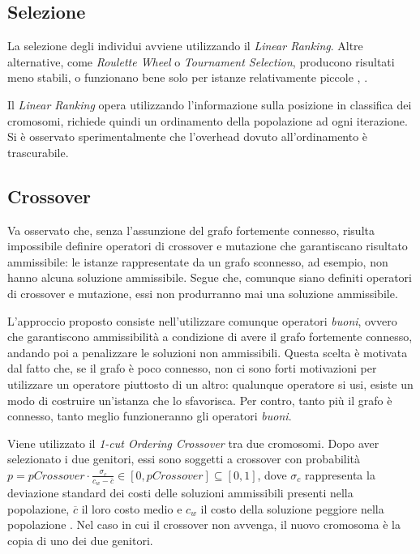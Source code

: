 \documentclass[a4paper, 10pt]{report}
\begin{document}
\subsection{Selezione}
La selezione degli individui avviene utilizzando il \emph{Linear Ranking}.
Altre alternative, come \emph{Roulette Wheel} o \emph{Tournament Selection},
producono risultati meno stabili, o funzionano bene solo per istanze relativamente
piccole \cite[Oladele et al.]{oladele2013}, \cite[Noraini et al.]{noraini2011}.

Il \emph{Linear Ranking} opera utilizzando l'informazione sulla posizione in
classifica dei cromosomi, richiede quindi un ordinamento della popolazione ad
ogni iterazione. Si è osservato sperimentalmente che l'overhead dovuto
all'ordinamento è trascurabile.


\subsection{Crossover}
Va osservato che, senza l'assunzione del grafo fortemente connesso,
risulta impossibile definire operatori di crossover e mutazione che
garantiscano risultato ammissibile: le istanze rappresentate da un
grafo sconnesso, ad esempio, non hanno alcuna soluzione ammissibile.
Segue che, comunque siano definiti operatori di crossover e mutazione,
essi non produrranno mai una soluzione ammissibile.

L'approccio proposto consiste nell'utilizzare comunque operatori \emph{buoni},
ovvero che garantiscono ammissibilità a condizione di avere il grafo fortemente
connesso, andando poi a penalizzare le soluzioni non ammissibili. Questa
scelta è motivata dal fatto che, se il grafo è poco connesso, non ci
sono forti motivazioni per utilizzare un operatore piuttosto di un altro:
qualunque operatore si usi, esiste un modo di costruire un'istanza che
lo sfavorisca. Per contro, tanto più il grafo è connesso, tanto
meglio funzioneranno gli operatori \emph{buoni}.

Viene utilizzato il \emph{1-cut Ordering Crossover} tra due cromosomi.
Dopo aver selezionato i due genitori, essi sono soggetti a crossover con
probabilità
$p = pCrossover \cdot \frac{\sigma_c}{c_w - \overline{c}} \in [0, pCrossover] \subseteq [0, 1]$,
dove $\sigma_c$ rappresenta la deviazione standard dei costi delle soluzioni
ammissibili presenti nella popolazione, $\overline{c}$ il loro costo medio
e $c_w$ il costo della soluzione peggiore nella popolazione \cite[Laoufi et al.]{laoufi}.
Nel caso in cui il crossover non avvenga, il nuovo cromosoma è la copia di
uno dei due genitori.
\end{document}
